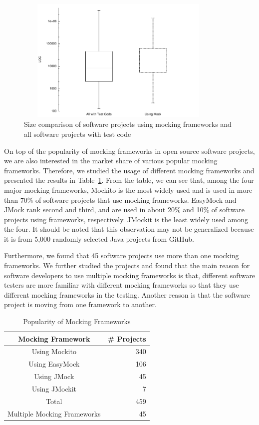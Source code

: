 \begin{figure}


  \center
\includegraphics[width=100mm, height=60mm]{mocking/boxplot.pdf}

  \caption{\label{fig:box} Size comparison of software projects using mocking frameworks and all software projects with test code}


\end{figure}

                       
On top of the popularity of mocking frameworks in open source software projects, we are also interested in the market share of various popular mocking frameworks. Therefore, we studied the usage of different mocking frameworks and presented the results in Table~\ref{table:var}. From the table, we can see that, among the four major mocking frameworks, Mockito is the most widely used and is used in more than 70\% of software projects that use mocking frameworks. EasyMock and JMock rank second and third, and are used in about 20\% and 10\% of software projects using frameworks, respectively. JMockit is the least widely used among the four. It should be noted that this observation may not be generalized because it is from 5,000 randomly selected Java projects from GitHub. 

Furthermore, we found that 45 software projects use more than one mocking frameworks. We further studied the projects and found that the main reason for software developers to use multiple mocking frameworks is that, different software testers are more familiar with different mocking frameworks so that they use different mocking frameworks in the testing. Another reason is that the software project is moving from one framework to another. 

\begin{table}
\caption{Popularity of Mocking Frameworks}
\small

\label{table:var}
\centering
\begin{tabular}{|c|r|}
\hline
 Mocking Framework & \# Projects\\
\hline
 Using Mockito & 340\\
 Using EasyMock & 106\\
 Using JMock & 45\\
 Using JMockit & 7\\
 Total & 459\\
 Multiple Mocking Frameworks & 45\\
\hline
\end{tabular}


\end{table}

